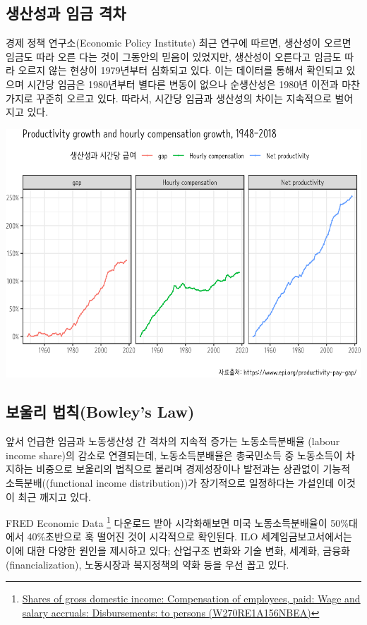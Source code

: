 \documentclass[smallextended]{svjour3}       %
\begin{document}
\hypertarget{wage-productivity-gap}{%
\subsection{생산성과 임금 격차}\label{wage-productivity-gap}}

경제 정책 연구소(Economic Policy
Institute)\cite{economic_policy_institute_2019} 최근 연구에 따르면,
생산성이 오르면 임금도 따라 오른 다는 것이 그동안의 믿음이 있었지만,
생산성이 오른다고 임금도 따라 오르지 않는 현상이 1979년부터 심화되고
있다. 이는 데이터\cite{bivens2014raising}를 통해서 확인되고 있으며
시간당 임금은 1980년부터 별다른 변동이 없으나 순생산성은 1980년 이전과
마찬가지로 꾸준히 오르고 있다. 따라서, 시간당 임금과 생산성의 차이는
지속적으로 벌어지고 있다.

\begin{center}\includegraphics[width=1\linewidth]{paper_files/figure-latex/productivity-gap-1} \end{center}

\hypertarget{bowley-law}{%
\subsection{보울리 법칙(Bowley's Law)}\label{bowley-law}}

앞서 언급한 임금과 노동생산성 간 격차의 지속적 증가는 노동소득분배율
(labour income share)의 감소로 연결되는데, 노동소득분배율은 총국민소득
중 노동소득이 차지하는 비중으로 보울리의 법칙으로 불리며 경제성장이나
발전과는 상관없이 기능적 소득분배((functional income distribution))가
장기적으로 일정하다는 가설\cite{lee_2014}인데 이것이 최근 깨지고 있다.

FRED Economic Data \footnote{\href{https://fred.stlouisfed.org/series/W270RE1A156NBEA}{Shares
  of gross domestic income: Compensation of employees, paid: Wage and
  salary accruals: Disbursements: to persons (W270RE1A156NBEA)}}
다운로드 받아 시각화해보면 미국 노동소득분배율이 50\%대에서 40\%초반으로
훅 떨어진 것이 시각적으로 확인된다. ILO
세계임금보고서\cite{ilo2015labour}에서는 이에 대한 다양한 원인을
제시하고 있다; 산업구조 변화와 기술 변화, 세계화,
금융화(financialization), 노동시장과 복지정책의 약화 등을 우선 꼽고
있다.
\end{document}
